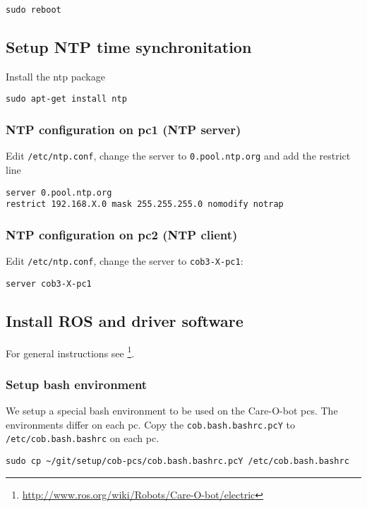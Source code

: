 \begin{lstlisting} 
sudo reboot
\end{lstlisting}

\subsection{Setup NTP time synchronitation}
Install the ntp package

\begin{lstlisting}
sudo apt-get install ntp
\end{lstlisting}

\subsubsection{NTP configuration on pc1 (NTP server)}
Edit \texttt{/etc/ntp.conf}, change the server to \texttt{0.pool.ntp.org} and add the restrict line

\begin{lstlisting} 
server 0.pool.ntp.org
restrict 192.168.X.0 mask 255.255.255.0 nomodify notrap
\end{lstlisting}

\subsubsection{NTP configuration on pc2 (NTP client)}
Edit \texttt{/etc/ntp.conf}, change the server to \texttt{cob3-X-pc1}:
\begin{lstlisting}
server cob3-X-pc1
\end{lstlisting}

\subsection{Install ROS and driver software}
For general instructions see \footnote{\url{http://www.ros.org/wiki/Robots/Care-O-bot/electric}}.

\subsubsection{Setup bash environment}
We setup a special bash environment to be used on the Care-O-bot pcs. The environments differ on each pc. Copy the \texttt{cob.bash.bashrc.pcY} to \texttt{/etc/cob.bash.bashrc} on each pc.

\begin{lstlisting}
sudo cp ~/git/setup/cob-pcs/cob.bash.bashrc.pcY /etc/cob.bash.bashrc
\end{lstlisting}

